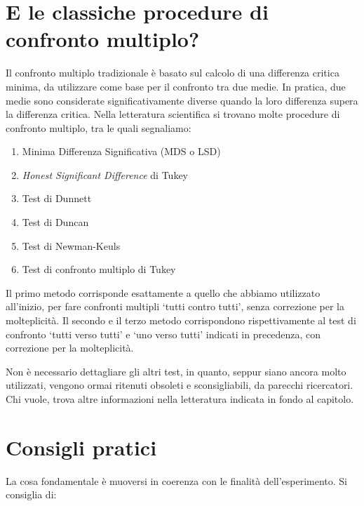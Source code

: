 \documentclass[a4paper,12pt,oneside]{book}
\providecommand{\tightlist}{%
  \setlength{\itemsep}{0pt}\setlength{\parskip}{0pt}}
\begin{document}
\hypertarget{e-le-classiche-procedure-di-confronto-multiplo}{%
\section{E le classiche procedure di confronto multiplo?}\label{e-le-classiche-procedure-di-confronto-multiplo}}

Il confronto multiplo tradizionale è basato sul calcolo di una differenza critica minima, da utilizzare come base per il confronto tra due medie. In pratica, due medie sono considerate significativamente diverse quando la loro differenza supera la differenza critica. Nella letteratura scientifica si trovano molte procedure di confronto multiplo, tra le quali segnaliamo:

\begin{enumerate}
\def\labelenumi{\arabic{enumi}.}
\tightlist
\item
  Minima Differenza Significativa (MDS o LSD)
\item
  \emph{Honest Significant Difference} di Tukey
\item
  Test di Dunnett
\item
  Test di Duncan
\item
  Test di Newman-Keuls
\item
  Test di confronto multiplo di Tukey
\end{enumerate}

Il primo metodo corrisponde esattamente a quello che abbiamo utilizzato all'inizio, per fare confronti multipli `tutti contro tutti', senza correzione per la molteplicità. Il secondo e il terzo metodo corrispondono rispettivamente al test di confronto `tutti verso tutti' e `uno verso tutti' indicati in precedenza, con correzione per la molteplicità.

Non è necessario dettagliare gli altri test, in quanto, seppur siano ancora molto utilizzati, vengono ormai ritenuti obsoleti e sconsigliabili, da parecchi ricercatori. Chi vuole, trova altre informazioni nella letteratura indicata in fondo al capitolo.

\hypertarget{consigli-pratici}{%
\section{Consigli pratici}\label{consigli-pratici}}

La cosa fondamentale è muoversi in coerenza con le finalità dell'esperimento. Si consiglia di:
\end{document}
